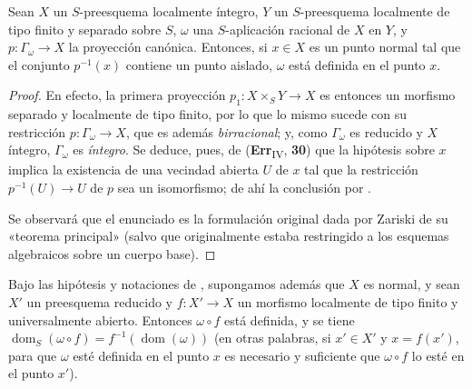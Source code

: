 \begin{proposition}[20.4.4]
\label{IV.20.4.4}
Sean $X$ un $S$-preesquema localmente íntegro, $Y$ un $S$-preesquema localmente de tipo finito y separado sobre $S$, $\omega$ una $S$-aplicación racional de $X$ en $Y$, y $p:\Gamma_\omega\to X$ la proyección canónica.
Entonces, si $x\in X$ es un punto \textup{normal} tal que el conjunto $p^{-1}(x)$ contiene un punto \textup{aislado}, $\omega$ está definida en el punto $x$.
\end{proposition}

\begin{proof}
En efecto, la primera proyección $p_1:X\times_S Y\to X$ es entonces un morfismo separado y localmente de tipo finito, por lo que lo mismo sucede con su restricción $p:\Gamma_\omega\to X$, que es además \emph{birracional}; y, como $\Gamma_\omega$ es reducido y $X$ íntegro, $\Gamma_\omega$ es \emph{íntegro}. Se deduce, pues, de (\textbf{Err}\textsubscript{IV}, \textbf{30}) que la hipótesis sobre $x$ implica la existencia de una vecindad abierta $U$ de $x$ tal que la restricción $p^{-1}(U)\to U$ de $p$ sea un isomorfismo; de ahí la conclusión por .

Se observará que el enunciado  es la formulación original dada por Zariski de su «teorema principal» (salvo que originalmente estaba restringido a los esquemas algebraicos sobre un cuerpo base).
\end{proof}

\begin{proposition}[20.4.5]
\label{IV.20.4.5}
Bajo las hipótesis y notaciones de , supongamos además que $X$ es normal, y sean $X'$ un preesquema \textup{reducido} y $f:X'\to X$ un morfismo localmente de tipo finito y \textup{universalmente abierto}.
Entonces $\omega\circ f$ está definida, y se tiene $\operatorname{dom}_S(\omega\circ f)=f^{-1}(\operatorname{dom}(\omega))$ \textup{(en otras palabras, si $x'\in X'$ y $x=f(x')$, para que $\omega$ esté definida en el punto $x$ es necesario y suficiente que $\omega\circ f$ lo esté en el punto $x'$)}.
\end{proposition}

